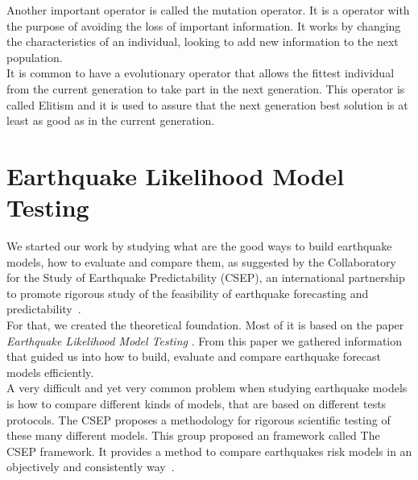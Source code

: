 Another important operator is called the mutation operator. It is a operator with the purpose of avoiding the loss of important information. It works by changing the characteristics of an individual, looking to add new information to the next population.\\

It is common to have a evolutionary operator that allows the fittest individual from the current generation to take part in the next generation. This operator is called Elitism and it is used to assure that the next generation best solution is at least as good as in the current generation.\\


\section{Earthquake Likelihood Model Testing}


We started our work by studying what are the good ways to build earthquake models, how to evaluate and compare them, as suggested by the Collaboratory for the Study of Earthquake Predictability (CSEP), an international partnership to promote rigorous study of the feasibility of earthquake forecasting and predictability~\cite{ecta14}.\\

For that, we created the theoretical foundation. Most of it is based on the paper {\it Earthquake Likelihood Model Testing} \cite{schorlemmer2007earthquake}. From this paper we gathered information that guided us into how to build, evaluate and compare earthquake forecast models efficiently.\\

A very difficult and yet very common problem when studying earthquake models is how to compare different kinds of models, that are based on different tests protocols. The CSEP proposes a methodology for rigorous scientific testing of these many different models. This group proposed an framework called The CSEP framework. It provides a method to compare earthquakes risk models in an objectively and consistently way~\cite{ecta14}.\\

